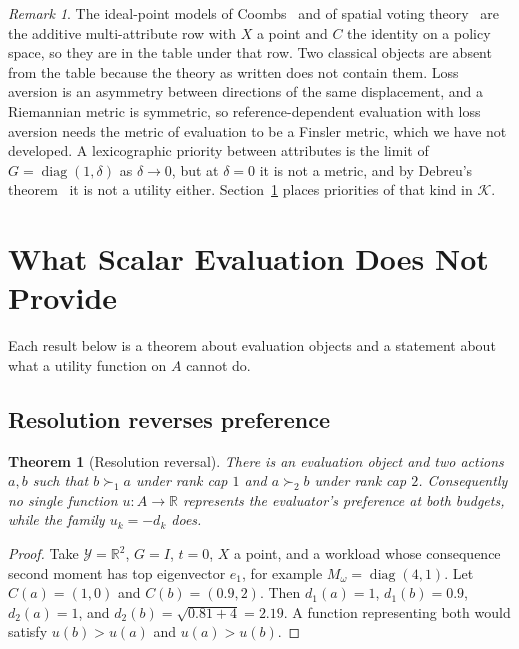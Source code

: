 \documentclass[11pt]{article}
\newtheorem{theorem}{Theorem}
\theoremstyle{definition}
\theoremstyle{remark}
\newtheorem*{remark}{Remark}
\newcommand{\K}{\mathcal{K}}
\newcommand{\Y}{\mathcal{Y}}
\newcommand{\R}{\mathbb{R}}
\begin{document}
\begin{remark}
The ideal-point models of Coombs~\cite{coombs1964} and of spatial voting theory~\cite{davis1970,enelow1984} are the additive multi-attribute row with $X$ a point and $C$ the identity on a policy space, so they are in the table under that row.
Two classical objects are absent from the table because the theory as written does not contain them.
Loss aversion is an asymmetry between directions of the same displacement, and a Riemannian metric is symmetric, so reference-dependent evaluation with loss aversion needs the metric of evaluation to be a Finsler metric, which we have not developed.
A lexicographic priority between attributes is the limit of $G=\operatorname{diag}(1,\delta)$ as $\delta\to0$, but at $\delta=0$ it is not a metric, and by Debreu's theorem~\cite{debreu1954} it is not a utility either.
Section~\ref{sec:new} places priorities of that kind in $\K$.
\end{remark}

\section{What Scalar Evaluation Does Not Provide}
\label{sec:new}

Each result below is a theorem about evaluation objects and a statement about what a utility function on $A$ cannot do.

\subsection{Resolution reverses preference}

\begin{theorem}[Resolution reversal]
\label{thm:reversal}
There is an evaluation object and two actions $a,b$ such that $b\succ_{1}a$ under rank cap $1$ and $a\succ_{2}b$ under rank cap $2$.
Consequently no single function $u:A\to\R$ represents the evaluator's preference at both budgets, while the family $u_{k}=-d_{k}$ does.
\end{theorem}

\begin{proof}
Take $\Y=\R^{2}$, $G=I$, $t=0$, $X$ a point, and a workload whose consequence second moment has top eigenvector $e_{1}$, for example $M_{\omega}=\operatorname{diag}(4,1)$.
Let $C(a)=(1,0)$ and $C(b)=(0.9,2)$.
Then $d_{1}(a)=1$, $d_{1}(b)=0.9$, $d_{2}(a)=1$, and $d_{2}(b)=\sqrt{0.81+4}=2.19$.
A function representing both would satisfy $u(b)>u(a)$ and $u(a)>u(b)$.
\end{proof}
\end{document}
